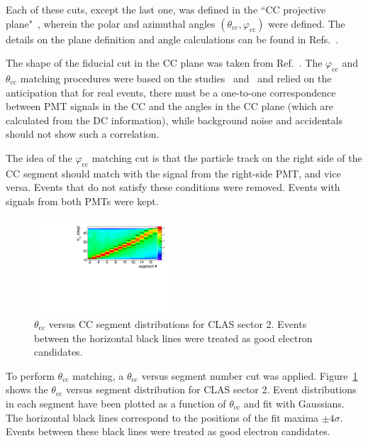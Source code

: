 \documentclass[prc,twocolumn,superscriptaddress,showpacs,amssymb,amsmath,amsfonts,aps,nofootinbib]{revtex4-1}
\begin{document}
Each of these cuts, except the last one, was defined in the ``CC projective plane"~\cite{Osipenko:2004}, wherein the polar and azimuthal angles $(\theta_{\text{cc}},\varphi_{\text{cc}})$ were defined. The details on the plane definition and angle calculations can be found in Refs.\!~\cite{my_an_note:2020,Osipenko:2004}.


The shape of the fiducial cut in the CC plane was taken from Ref.\!~\cite{Khetarpal:2010}. The $\varphi_{\text{cc}}$ and $\theta_{\text{cc}}$ matching procedures were based on the studies~\cite{Osipenko:2004} and~\cite{Ungaro:2010} and relied on the anticipation that for real events, there must be a one-to-one correspondence between PMT signals in the CC and the angles in the CC plane (which are calculated from the DC information), while background noise and accidentals should not show such a correlation.


The idea of the $\varphi_{\text{cc}}$ matching cut is that the particle track on the right side of the CC segment should match with the signal from the right-side PMT, and vice versa. Events that do not satisfy these conditions were removed. Events with signals from both PMTs were kept.


\begin{figure}[htp]
\begin{center}
 \includegraphics[width=0.45\textwidth,keepaspectratio]{pictures/event_selection/th_vs_seg.pdf}
\caption{$\theta_{\text{cc}}$ versus CC segment distributions for CLAS sector 2. Events between the horizontal black lines were treated as good electron candidates.}
\label{fig:th_vs_seg}
\end{center}
\end{figure}


To perform $\theta_{\text{cc}}$ matching, a $\theta_{\text{cc}}$ versus segment number cut was applied. Figure~\ref{fig:th_vs_seg} shows the $\theta_{\text{cc}}$ versus segment distribution for CLAS sector 2. Event distributions in each segment have been plotted as a function of $\theta_{\text{cc}}$ and fit with Gaussians. The horizontal black lines correspond to the positions of the fit maxima $\pm4\sigma$. Events between these black lines were treated as good electron candidates.
\end{document}
